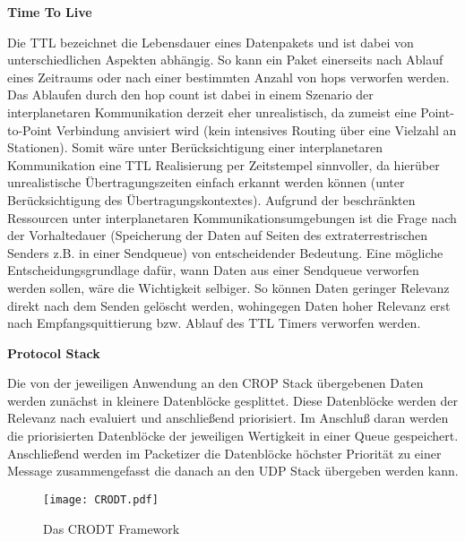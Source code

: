 \label{sec:Vorueberlegung}

\textbf{Time To Live}

Die TTL bezeichnet die Lebensdauer eines Datenpakets und ist dabei von
unterschiedlichen Aspekten abh{\"a}ngig. So kann ein Paket einerseits nach
Ablauf eines Zeitraums oder nach einer bestimmten Anzahl
von hops verworfen werden. Das Ablaufen durch den hop count ist dabei in einem
Szenario der interplanetaren Kommunikation derzeit eher unrealistisch, da
zumeist eine Point-to-Point Verbindung anvisiert wird (kein intensives Routing {\"u}ber eine
Vielzahl an Stationen). Somit w{\"a}re unter Ber{\"u}cksichtigung einer
interplanetaren Kommunikation eine TTL Realisierung per Zeitstempel
sinnvoller, da hier{\"u}ber unrealistische {\"U}bertragungszeiten einfach
erkannt werden k{\"o}nnen (unter Ber{\"u}cksichtigung des {\"U}bertragungskontextes).
Aufgrund der beschr{\"a}nkten Ressourcen unter interplanetaren
Kommunikationsumgebungen ist die Frage nach der Vorhaltedauer (Speicherung der
Daten auf Seiten des extraterrestrischen Senders z.B. in einer Sendqueue) von
entscheidender Bedeutung.
Eine m{\"o}gliche Entscheidungsgrundlage daf{\"u}r, wann Daten aus einer
Sendqueue verworfen werden sollen, w{\"a}re die Wichtigkeit selbiger. So
k{\"o}nnen Daten geringer Relevanz direkt nach dem Senden gel{\"o}scht werden,
wohingegen Daten hoher Relevanz erst nach Empfangsquittierung bzw. Ablauf des
TTL Timers verworfen werden.

\newpage %
\textbf{Protocol Stack}

Die von der jeweiligen Anwendung an den CROP Stack {\"u}bergebenen Daten werden
zun{\"a}chst in kleinere Datenbl{\"o}cke gesplittet. Diese Datenbl{\"o}cke
werden der Relevanz nach evaluiert und anschlie{\ss}end priorisiert.
Im Anschlu{\ss} daran werden die priorisierten Datenbl{\"o}cke der jeweiligen
Wertigkeit in einer Queue gespeichert. Anschlie{\ss}end werden im
Packetizer die Datenbl{\"o}cke h{\"o}chster Priorit{\"a}t zu einer Message zusammengefasst
die danach an den UDP Stack {\"u}bergeben werden kann.

\begin{figure}[H]
\centering
\texttt{[image: CRODT.pdf]}
\caption{Das CRODT Framework}
\label{fig:CRODT}
\end{figure}

